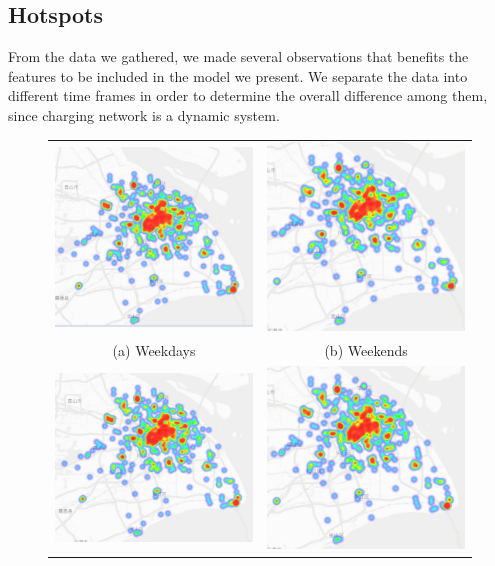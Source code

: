 \subsection{Hotspots}
From the data we gathered, we made several observations that benefits the features to be included in the model we present. We separate the data into different time frames in order to determine the overall difference among them, since charging network is a dynamic system.
\begin{figure}[htbp]
	\begin{tabular}{cc}
		\includegraphics[width=0.45\columnwidth]{./figures/weekday.pdf} &  \includegraphics[width=0.45\columnwidth]{./figures/weekend.pdf} \\
		(a) Weekdays & (b) Weekends \\[6pt] 
		\includegraphics[width=0.45\columnwidth]{./figures/morning.pdf} &
		\includegraphics[width=0.45\columnwidth]{./figures/evening.pdf} \\

\end{tabular}
\end{figure}
